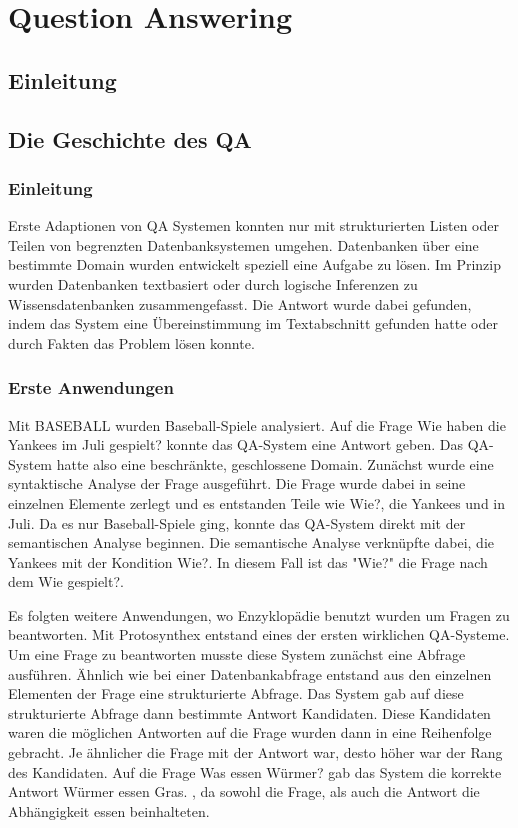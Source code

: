 \documentclass[
        ngerman,
        paper=a4,
        numbers=noendperiod,
]{scrreprt}
\begin{document}
\chapter{Question Answering}

\section{Einleitung} %
\section{Die Geschichte des QA} %
\subsection{Einleitung}
Erste Adaptionen von QA Systemen konnten nur mit strukturierten Listen oder Teilen von begrenzten Datenbanksystemen umgehen. Datenbanken über eine bestimmte Domain wurden entwickelt speziell eine Aufgabe zu lösen. Im Prinzip wurden Datenbanken textbasiert oder durch logische Inferenzen zu Wissensdatenbanken zusammengefasst. Die Antwort wurde dabei gefunden, indem das System eine Übereinstimmung im Textabschnitt gefunden hatte oder durch Fakten das Problem lösen konnte.
\subsection{Erste Anwendungen}
Mit \glqq BASEBALL\grqq{}  \citep{Green1961Baseball:Question-answerer} wurden Baseball-Spiele analysiert.  Auf die Frage \glqq Wie haben die Yankees im Juli gespielt?\grqq{} konnte das QA-System eine Antwort geben. Das QA-System hatte also eine beschränkte, geschlossene Domain. Zunächst wurde eine syntaktische Analyse der Frage ausgeführt. Die Frage wurde dabei in seine einzelnen Elemente zerlegt und es entstanden Teile wie \glqq Wie?\grqq{}, \glqq die Yankees\grqq{} und \glqq in Juli\grqq{}. Da es nur Baseball-Spiele ging, konnte das QA-System direkt mit der semantischen Analyse beginnen. Die semantische Analyse verknüpfte dabei, \glqq die Yankees\grqq{} mit der Kondition \glqq Wie?\grqq{}. In diesem Fall ist das "Wie?" die Frage nach dem \glqq Wie gespielt?\grqq{}.

Es folgten weitere Anwendungen, wo Enzyklopädie benutzt wurden um Fragen zu beantworten. Mit \glqq Protosynthex\grqq{} \citep{Simmons1964IndexingQuestions} entstand eines der ersten wirklichen QA-Systeme. Um eine Frage zu beantworten musste diese System zunächst eine Abfrage ausführen. Ähnlich wie bei einer Datenbankabfrage entstand aus den einzelnen Elementen der Frage eine strukturierte Abfrage. Das System gab auf diese strukturierte Abfrage dann bestimmte Antwort Kandidaten. Diese Kandidaten waren die möglichen Antworten auf die Frage wurden dann in eine Reihenfolge gebracht. Je ähnlicher die Frage mit der Antwort war, desto höher war der Rang des Kandidaten. Auf die Frage \glqq Was essen Würmer?\grqq{} gab das System die korrekte Antwort \glqq Würmer essen Gras.\grqq{} , da sowohl die Frage, als auch die Antwort die Abhängigkeit \glqq essen\grqq{} beinhalteten. 
\end{document}
